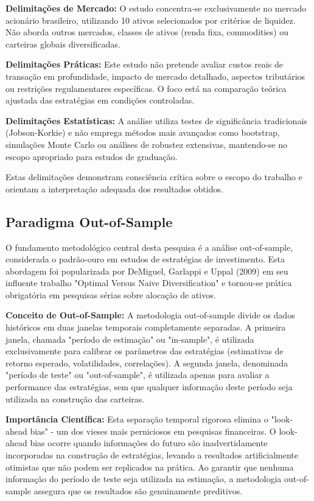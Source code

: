\textbf{Delimitações de Mercado:} O estudo concentra-se exclusivamente no mercado acionário brasileiro, utilizando 10 ativos selecionados por critérios de liquidez. Não aborda outros mercados, classes de ativos (renda fixa, commodities) ou carteiras globais diversificadas.

\textbf{Delimitações Práticas:} Este estudo não pretende avaliar custos reais de transação em profundidade, impacto de mercado detalhado, aspectos tributários ou restrições regulamentares específicas. O foco está na comparação teórica ajustada das estratégias em condições controladas.

\textbf{Delimitações Estatísticas:} A análise utiliza testes de significância tradicionais (Jobson-Korkie) e não emprega métodos mais avançados como bootstrap, simulações Monte Carlo ou análises de robustez extensivas, mantendo-se no escopo apropriado para estudos de graduação.

Estas delimitações demonstram consciência crítica sobre o escopo do trabalho e orientam a interpretação adequada dos resultados obtidos.

\subsection{Paradigma Out-of-Sample}

O fundamento metodológico central desta pesquisa é a análise out-of-sample, considerada o padrão-ouro em estudos de estratégias de investimento. Esta abordagem foi popularizada por DeMiguel, Garlappi e Uppal (2009) em seu influente trabalho "Optimal Versus Naive Diversification" e tornou-se prática obrigatória em pesquisas sérias sobre alocação de ativos.

\textbf{Conceito de Out-of-Sample:} A metodologia out-of-sample divide os dados históricos em duas janelas temporais completamente separadas. A primeira janela, chamada "período de estimação" ou "in-sample", é utilizada exclusivamente para calibrar os parâmetros das estratégias (estimativas de retorno esperado, volatilidades, correlações). A segunda janela, denominada "período de teste" ou "out-of-sample", é utilizada apenas para avaliar a performance das estratégias, sem que qualquer informação deste período seja utilizada na construção das carteiras.

\textbf{Importância Científica:} Esta separação temporal rigorosa elimina o "look-ahead bias" - um dos vieses mais perniciosos em pesquisas financeiras. O look-ahead bias ocorre quando informações do futuro são inadvertidamente incorporadas na construção de estratégias, levando a resultados artificialmente otimistas que não podem ser replicados na prática. Ao garantir que nenhuma informação do período de teste seja utilizada na estimação, a metodologia out-of-sample assegura que os resultados são genuinamente preditivos.

